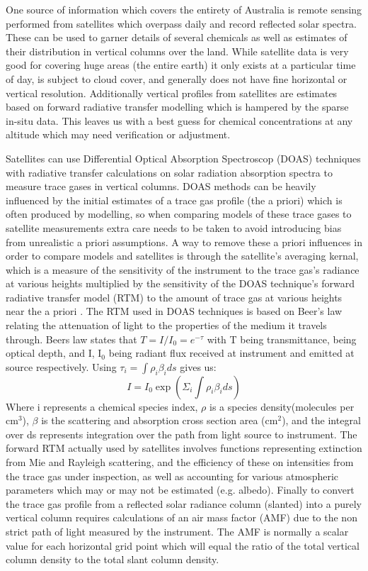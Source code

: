 One source of information which covers the entirety of Australia is remote sensing performed from satellites which overpass daily and record reflected solar spectra.
These can be used to garner details of several chemicals as well as estimates of their distribution in vertical columns over the land.
While satellite data is very good for covering huge areas (the entire earth) it only exists at a particular time of day, is subject to cloud cover, and generally does not have fine horizontal or vertical resolution.
Additionally vertical profiles from satellites are estimates based on forward radiative transfer modelling which is hampered by the sparse in-situ data.
This leaves us with a best guess for chemical concentrations at any altitude which may need verification or adjustment.

Satellites can use Differential Optical Absorption Spectroscop (DOAS) techniques with radiative transfer calculations on solar radiation absorption spectra to measure trace gases in vertical columns.
DOAS methods can be heavily influenced by the initial estimates of a trace gas profile (the a priori) which is often produced by modelling, so when comparing models of these trace gases to satellite measurements extra care needs to be taken to avoid introducing bias from unrealistic a priori assumptions.
A way to remove these a priori influences in order to compare models and satellites is through the satellite's averaging kernal, which is a measure of the sensitivity of the instrument to the trace gas's radiance at various heights multiplied by the sensitivity of the DOAS technique's forward radiative transfer model (RTM) to the amount of trace gas at various heights near the a priori \cite{Eskes_2003}.
The RTM used in DOAS techniques is based on Beer's law relating the attenuation of light to the properties of the medium it travels through.
Beers law states that $ T = I/I_0 = e^{-\tau} $ with T being transmittance, \tau being optical depth, and I, I$_0$ being radiant flux received at instrument and emitted at source respectively.
Using 
$ \tau_i = \int \rho_i \beta_i ds $ gives us:
$$ I = I_0 \exp {\left( \Sigma_i \int \rho_i \beta_i ds \right) } $$
Where i represents a chemical species index, $\rho$ is a species density(molecules per cm$^3$), $\beta$ is the scattering and absorption cross section area (cm$^2$), and the integral over ds represents integration over the path from light source to instrument.
The forward RTM actually used by satellites involves functions representing extinction from Mie and Rayleigh scattering, and the efficiency of these on intensities from the trace gas under inspection, as well as accounting for various atmospheric parameters which may or may not be estimated (e.g. albedo).
Finally to convert the trace gas profile from a reflected solar radiance column (slanted) into a purely vertical column requires calculations of an air mass factor (AMF) due to the non strict path of light measured by the instrument.
The AMF is normally a scalar value for each horizontal grid point which will equal the ratio of the total vertical column density to the total slant column density.

